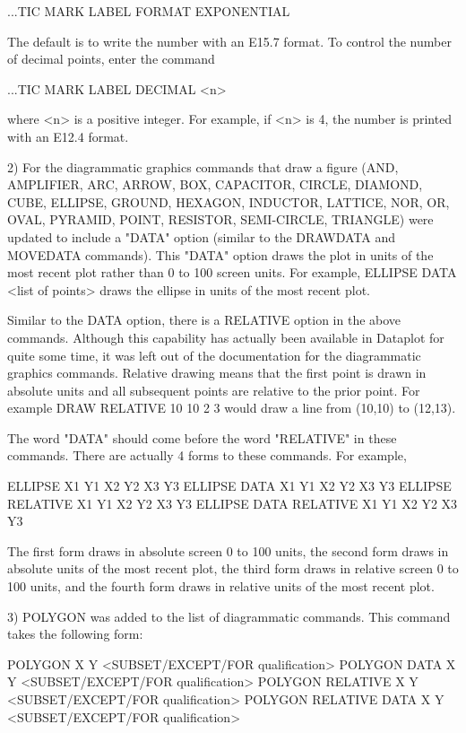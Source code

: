 {       ...TIC MARK LABEL FORMAT EXPONENTIAL

    The default is to write the number with an E15.7 format.
    To control the number of decimal points, enter the command

       ...TIC MARK LABEL DECIMAL <n>

    where <n> is a positive integer.  For example, if
    <n> is 4, the number is printed with an E12.4 format.

 2) For the diagrammatic graphics commands that draw a figure
    (AND, AMPLIFIER, ARC, ARROW, BOX, CAPACITOR, CIRCLE, DIAMOND,
    CUBE, ELLIPSE, GROUND, HEXAGON, INDUCTOR, LATTICE, NOR, OR,
    OVAL, PYRAMID, POINT, RESISTOR, SEMI-CIRCLE, TRIANGLE)
    were updated to include a "DATA" option (similar to the
    DRAWDATA and MOVEDATA commands).  This "DATA" option draws the
    plot in units of the most recent plot rather than 0 to 100
    screen units.  For example, ELLIPSE DATA <list of points>
    draws the ellipse in units of the most recent plot.

    Similar to the DATA option, there is a RELATIVE option in the
    above commands.  Although this capability has actually been
    available in Dataplot for quite some time, it was left out
    of the documentation for the diagrammatic graphics commands.
    Relative drawing means that the first point is drawn in
    absolute units and all subsequent points are relative to the
    prior point.  For example DRAW RELATIVE 10 10 2 3
    would draw a line from (10,10) to (12,13).

    The word "DATA" should come before the word "RELATIVE"
    in these commands.  There are actually 4 forms to these
    commands.  For example,

       ELLIPSE X1 Y1 X2 Y2 X3 Y3
       ELLIPSE DATA X1 Y1 X2 Y2 X3 Y3
       ELLIPSE RELATIVE X1 Y1 X2 Y2 X3 Y3
       ELLIPSE DATA RELATIVE X1 Y1 X2 Y2 X3 Y3

    The first form draws in absolute screen 0 to 100 units,
    the second form draws in absolute units of the most recent plot,
    the third form draws in relative screen 0 to 100 units, and
    the fourth form draws in relative units of the most recent plot.

 3) POLYGON was added to the list of diagrammatic commands.  This
    command takes the following form:

      POLYGON X Y       <SUBSET/EXCEPT/FOR qualification>
      POLYGON DATA X Y  <SUBSET/EXCEPT/FOR qualification>
      POLYGON RELATIVE X Y       <SUBSET/EXCEPT/FOR qualification>
      POLYGON RELATIVE DATA X Y  <SUBSET/EXCEPT/FOR qualification>

}
